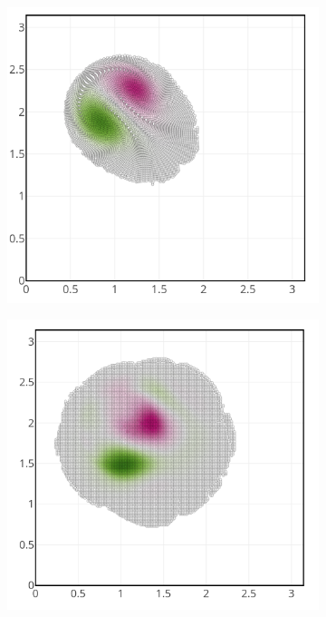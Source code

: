 \begin{figure}[h!]
	\centering
	\begin{subfigure}{0.45\textwidth}
		\centering
		\includegraphics[width=0.8\linewidth]{./images/app2d/assim_member_forecast.png}
	\end{subfigure}
	\begin{subfigure}{0.45\textwidth}
		\centering
		\includegraphics[width=0.8\linewidth]{./images/app2d/assim_member_rmf.png}
	\end{subfigure}
	\begin{subfigure}{0.45\textwidth}
		\centering

\end{subfigure}
\end{figure}
